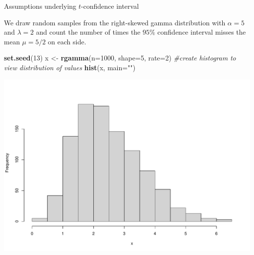 \documentclass[
  ignorenonframetext,
]{beamer}
\newenvironment{Shaded}{\begin{snugshade}}{\end{snugshade}}
\newcommand{\AttributeTok}[1]{\textcolor[rgb]{0.13,0.29,0.53}{#1}}
\newcommand{\CommentTok}[1]{\textcolor[rgb]{0.56,0.35,0.01}{\textit{#1}}}
\newcommand{\DecValTok}[1]{\textcolor[rgb]{0.00,0.00,0.81}{#1}}
\newcommand{\FunctionTok}[1]{\textcolor[rgb]{0.13,0.29,0.53}{\textbf{#1}}}
\newcommand{\NormalTok}[1]{#1}
\newcommand{\OtherTok}[1]{\textcolor[rgb]{0.56,0.35,0.01}{#1}}
\newcommand{\StringTok}[1]{\textcolor[rgb]{0.31,0.60,0.02}{#1}}
\begin{document}
\begin{frame}[fragile]{Assumptions underlying \(t\)-confidence interval}
\protect\hypertarget{assumptions-underlying-t-confidence-interval-2}{}
\begin{tcolorbox}
We draw random samples from the right-skewed gamma distribution with $\alpha=5$ and $\lambda=2$ and count the number of times the $95\%$ confidence interval misses the mean $\mu=5/2$ on each side.
\end{tcolorbox}

\normalsize

\begin{Shaded}
\begin{Highlighting}[]
\FunctionTok{set.seed}\NormalTok{(}\DecValTok{13}\NormalTok{)}
\NormalTok{x }\OtherTok{\textless{}{-}} \FunctionTok{rgamma}\NormalTok{(}\AttributeTok{n=}\DecValTok{1000}\NormalTok{, }\AttributeTok{shape=}\DecValTok{5}\NormalTok{, }\AttributeTok{rate=}\DecValTok{2}\NormalTok{)}
\CommentTok{\#create histogram to view distribution of values}
\FunctionTok{hist}\NormalTok{(x, }\AttributeTok{main=}\StringTok{""}\NormalTok{)}
\end{Highlighting}
\end{Shaded}

\begin{center}\includegraphics[width=0.6\linewidth,height=0.4\textheight]{Week10A_files/figure-beamer/unnamed-chunk-64-1} \end{center}
\normalsize
\end{frame}
\end{document}
